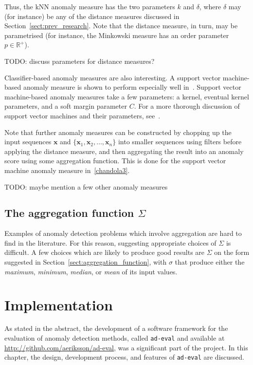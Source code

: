 Thus, the kNN anomaly measure has the two parameters $k$ and $\delta$, where $\delta$ may (for instance) be any of the distance measures discussed in Section~\ref{sect:prev_research}. Note that the distance measure, in turn, may be parametrised (for instance, the Minkowski measure has an order parameter $p \in \mathbb{R}^+$).

TODO: discuss parameters for distance measures?

Classifier-based anomaly measures are also interesting. A support vector machine-based anomaly measure is shown to perform especially well in~\cite{chandola3}. Support vector machine-based anomaly measures take a few parameters: a kernel, eventual kernel parameters, and a soft margin parameter $C$. For a more thorough discussion of support vector machines and their parameters, see~\cite{TODO}.

Note that further anomaly measures can be constructed by chopping up the input sequences $\mathbf{x}$ and $\{\mathbf{x}_1, \mathbf{x}_2, \dots, \mathbf{x}_n\}$ into smaller sequences using filters before applying the distance measure, and then aggregating the result into an anomaly score using some aggregation function. This is done for the support vector machine anomaly measure in~\ref{chandola3}.

TODO: maybe mention a few other anomaly measures

\subsection{The aggregation function $\Sigma$}

Examples of anomaly detection problems which involve aggregation are hard to find in the literature. For this reason, suggesting appropriate choices of $\Sigma$ is difficult. A few choices which are likely to produce good results are $\Sigma$ on the form suggested in Section~\ref{sect:aggregation_function}, with $\sigma$ that produce either the \emph{maximum}, \emph{minimum}, \emph{median}, or \emph{mean} of its input values.

\section{Implementation}
\label{ch:implementation}

As stated in the abstract, the development of a software framework for the evaluation of anomaly detection methods, called \texttt{ad-eval} and available at \url{http://github.com/aeriksson/ad-eval}, was a significant part of the project. In this chapter, the design, development process, and features of \texttt{ad-eval} are discussed.

